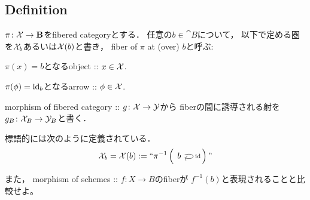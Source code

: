 \subsection{Definition}
\begin{Def}[Fiber]
    $\pi \colon \stX \to \cat{B}$をfibered categoryとする．
    任意の$b \in \cat{B}$について，
    以下で定める圏を$\stX_b$あるいは$\stX(b)$と書き，
    fiber of $\pi$ at (over) $b$と呼ぶ:
    \begin{description}[labelindent=1cm]
        \item[Object.] $\pi(x)=b$となるobject :: $x \in \stX$.
        \item[Arrow.] $\pi(\phi)=\id[b]$となるarrow :: $\phi \in \stX$.
    \end{description}

    morphism of fibered category :: $g \colon \stX \to \stY$から
    fiberの間に誘導される射を$g_B \colon \stX_B \to \stY_B$と書く．
\end{Def}
\begin{Remark}
    標語的には次のように定義されている．
    \[
        \stX_b=\stX(b):=``
        \pi^{-1} \left(
        \begin{tikzcd}
            b \ar[loop right, "\id"]
        \end{tikzcd}
        \right)"
    \]
    
    また，
    morphism of schemes :: $f \colon X \to B$のfiberが
    $f^{-1}(b)$と表現されることと比較せよ。
\end{Remark}

